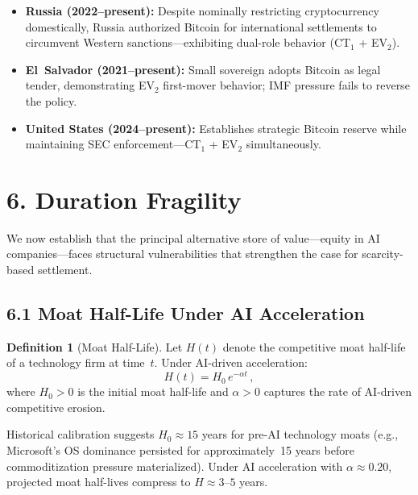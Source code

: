 \documentclass[12pt]{article}
\theoremstyle{definition}
\newtheorem{definition}{Definition}
\theoremstyle{remark}
\begin{document}
\begin{itemize}
  \item \textbf{Russia (2022--present):} Despite nominally restricting
    cryptocurrency domestically, Russia authorized Bitcoin for
    international settlements to circumvent Western
    sanctions---exhibiting dual-role behavior (CT$_1$ + EV$_2$).
  \item \textbf{El~Salvador (2021--present):} Small sovereign adopts
    Bitcoin as legal tender, demonstrating EV$_2$ first-mover behavior;
    IMF pressure fails to reverse the policy.
  \item \textbf{United States (2024--present):} Establishes strategic
    Bitcoin reserve while maintaining SEC enforcement---CT$_1$ + EV$_2$
    simultaneously.
\end{itemize}

\section{6. Duration Fragility}\label{sec:duration}

We now establish that the principal alternative store of value---equity
in AI companies---faces structural vulnerabilities that strengthen the
case for scarcity-based settlement.

\subsection{6.1 Moat Half-Life Under AI Acceleration}

\begin{definition}[Moat Half-Life]\label{def:moat}
Let $H(t)$ denote the competitive moat half-life of a technology firm
at time~$t$. Under AI-driven acceleration:
\begin{equation}\label{eq:moat}
  H(t) = H_0 \, e^{-\alpha t} \,,
\end{equation}
where $H_0 > 0$ is the initial moat half-life and $\alpha > 0$ captures
the rate of AI-driven competitive erosion.
\end{definition}

Historical calibration suggests $H_0 \approx 15$ years for pre-AI
technology moats (e.g., Microsoft's OS dominance persisted for
approximately~15 years before commoditization pressure materialized). Under
AI acceleration with $\alpha \approx 0.20$, projected moat half-lives
compress to $H \approx 3$--$5$ years.
\end{document}
